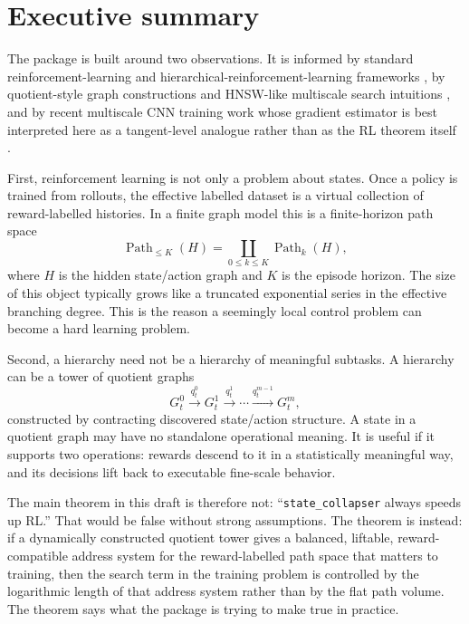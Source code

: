 \documentclass[11pt]{article}
\newcommand{\Path}{\operatorname{Path}}
\begin{document}
\setcounter{tocdepth}{2}
\tableofcontents

\section{Executive summary}

The package is built around two observations.  It is informed by standard reinforcement-learning and hierarchical-reinforcement-learning frameworks \cite{SBRL,SPS,Diet,PSTQ,HutsebautBuysseHRLSurvey}, by quotient-style graph constructions and HNSW-like multiscale search intuitions \cite{MalikThesis,MalkovYashuninHNSW2018,CLRS3}, and by recent multiscale CNN training work whose gradient estimator is best interpreted here as a tangent-level analogue rather than as the RL theorem itself \cite{AhamedZakariaeiHaberEliasofMGE2026}.

First, reinforcement learning is not only a problem about states.  Once a policy is trained from rollouts, the effective labelled dataset is a virtual collection of reward-labelled histories.  In a finite graph model this is a finite-horizon path space
\[
    \Path_{\le K}(H)=\coprod_{0\le k\le K}\Path_k(H),
\]
where \(H\) is the hidden state/action graph and \(K\) is the episode horizon.  The size of this object typically grows like a truncated exponential series in the effective branching degree.  This is the reason a seemingly local control problem can become a hard learning problem.

Second, a hierarchy need not be a hierarchy of meaningful subtasks.  A hierarchy can be a tower of quotient graphs
\[
    G^0_t \xrightarrow{q^0_t} G^1_t \xrightarrow{q^1_t} \cdots \xrightarrow{q^{m-1}_t} G^m_t,
\]
constructed by contracting discovered state/action structure.  A state in a quotient graph may have no standalone operational meaning.  It is useful if it supports two operations: rewards descend to it in a statistically meaningful way, and its decisions lift back to executable fine-scale behavior.

The main theorem in this draft is therefore not: ``\texttt{state\_collapser} always speeds up RL.''  That would be false without strong assumptions.  The theorem is instead: if a dynamically constructed quotient tower gives a balanced, liftable, reward-compatible address system for the reward-labelled path space that matters to training, then the search term in the training problem is controlled by the logarithmic length of that address system rather than by the flat path volume.  The theorem says what the package is trying to make true in practice.
\end{document}
